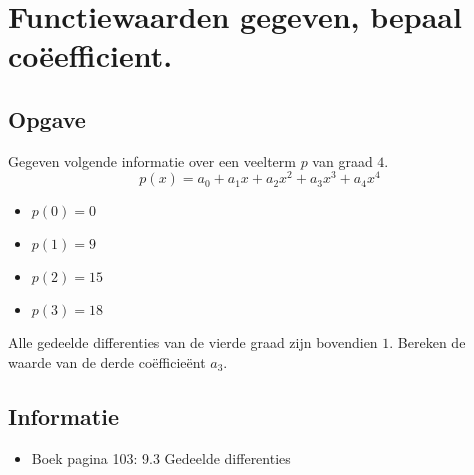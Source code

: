 \documentclass[examenvragen.tex]{subfiles}
\begin{document}
\section{Functiewaarden gegeven, bepaal co\"eefficient.}
\subsection{Opgave}
Gegeven volgende informatie over een veelterm $p$ van graad $4$.
\[
p(x) = a_{0} + a_1x + a_2x^{2} +a_{3}x^{3}+a_{4}x^{4}
\]
\begin{multicols}{4}
\begin{itemize}
\item $p(0)=0$
\item $p(1)=9$
\item $p(2)=15$
\item $p(3)=18$
\end{itemize}
\end{multicols}
Alle gedeelde differenties van de vierde graad zijn bovendien $1$.
Bereken de waarde van de derde co\"efficie\"ent $a_3$.
\subsection{Informatie}
\begin{itemize}
\item Boek pagina 103: 9.3 Gedeelde differenties
\end{itemize}
\end{document}
